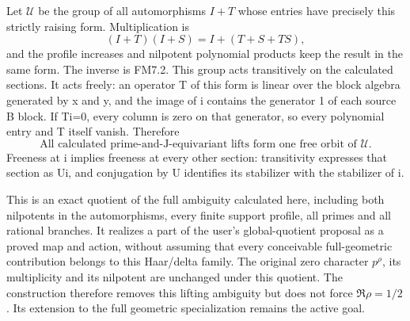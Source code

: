 Let \(\mathcal U\) be the group of all automorphisms \(I+T\) whose
entries have precisely this strictly raising form. Multiplication is \[
(I+T)(I+S)=I+(T+S+TS),
\tag{FM7.3}
\] and the profile increases and nilpotent polynomial products keep the
result in the same form. The inverse is FM7.2. This group acts
transitively on the calculated sections. It acts freely: an operator T
of this form is linear over the block algebra generated by x and y, and
the image of i contains the generator 1 of each source B block. If Ti=0,
every column is zero on that generator, so every polynomial entry and T
itself vanish. Therefore \[
\boxed{\text{All calculated prime-and-J-equivariant lifts form one free orbit of }\mathcal U.}
\tag{FM7.4}
\] Freeness at i implies freeness at every other section: transitivity
expresses that section as Ui, and conjugation by U identifies its
stabilizer with the stabilizer of i.

This is an exact quotient of the full ambiguity calculated here,
including both nilpotents in the automorphisms, every finite support
profile, all primes and all rational branches. It realizes a part of the
user's global-quotient proposal as a proved map and action, without
assuming that every conceivable full-geometric contribution belongs to
this Haar/delta family. The original zero character \(p^\rho\), its
multiplicity and its nilpotent are unchanged under this quotient. The
construction therefore removes this lifting ambiguity but does not force
\(\Re\rho=1/2\). Its extension to the full geometric specialization
remains the active goal.

